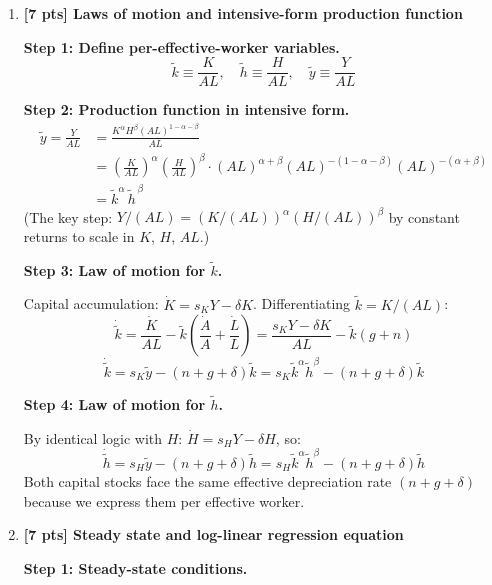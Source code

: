 \documentclass[a4paper,11pt]{article}
\newcommand{\ktilde}{\tilde{k}}
\newcommand{\ytilde}{\tilde{y}}
\begin{document}
\bigskip
\begin{enumerate}[label=\textbf{(\arabic*)},leftmargin=*]

\item \textbf{[7 pts] Laws of motion and intensive-form production function}

\begin{answerbox}
\textbf{Step 1: Define per-effective-worker variables.}
\[
  \ktilde \equiv \frac{K}{AL}, \quad \tilde{h} \equiv \frac{H}{AL}, \quad \ytilde \equiv \frac{Y}{AL}
\]

\textbf{Step 2: Production function in intensive form.}
\begin{align*}
  \ytilde = \frac{Y}{AL}
  &= \frac{K^{\alpha} H^{\beta} (AL)^{1-\alpha-\beta}}{AL} \\
  &= \left(\frac{K}{AL}\right)^{\!\alpha} \left(\frac{H}{AL}\right)^{\!\beta}
     \cdot (AL)^{\alpha+\beta} (AL)^{-(1-\alpha-\beta)} (AL)^{-(\alpha+\beta)} \\
  &= \ktilde^{\alpha}\,\tilde{h}^{\,\beta} \tag{$\star$}
\end{align*}
(The key step: $Y/(AL) = (K/(AL))^\alpha (H/(AL))^\beta$ by constant returns to scale in $K$, $H$, $AL$.)

\textbf{Step 3: Law of motion for $\ktilde$.}

Capital accumulation: $\dot{K} = s_K Y - \delta K$. Differentiating $\ktilde = K/(AL)$:
\[
  \dot{\ktilde} = \frac{\dot{K}}{AL} - \ktilde \left(\frac{\dot{A}}{A} + \frac{\dot{L}}{L}\right) = \frac{s_K Y - \delta K}{AL} - \ktilde(g + n)
\]
\[
  \boxed{\dot{\ktilde} = s_K \ytilde - (n + g + \delta)\ktilde = s_K \ktilde^{\alpha}\tilde{h}^{\beta} - (n+g+\delta)\ktilde}
\]

\textbf{Step 4: Law of motion for $\tilde{h}$.}

By identical logic with $H$: $\dot{H} = s_H Y - \delta H$, so:
\[
  \boxed{\dot{\tilde{h}} = s_H \ytilde - (n + g + \delta)\tilde{h} = s_H \ktilde^{\alpha}\tilde{h}^{\beta} - (n+g+\delta)\tilde{h}}
\]
Both capital stocks face the same effective depreciation rate $(n+g+\delta)$ because we express them per effective worker.
\end{answerbox}

\bigskip

\item \textbf{[7 pts] Steady state and log-linear regression equation}

\begin{answerbox}
\textbf{Step 1: Steady-state conditions.}


\end{answerbox}
\end{enumerate}
\end{document}
